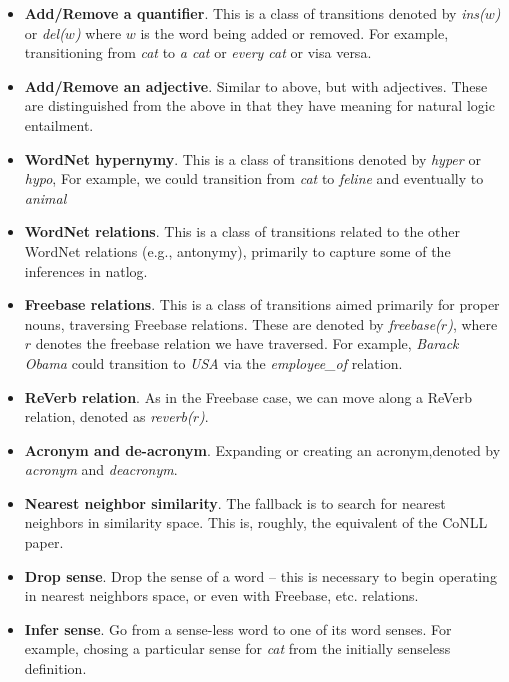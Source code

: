 \documentclass[11pt,a4paper]{article}
\def\w#1{\textit{#1}}
\begin{document}
\begin{itemize}
\item \textbf{Add/Remove a quantifier}.
      This is a class of transitions denoted by
      \textit{ins($w$)} or \textit{del($w$)} 
      where $w$ is the word being added or removed.
      For example, transitioning from \w{cat} to
      \w{a cat} or \w{every cat} or visa versa.
\item \textbf{Add/Remove an adjective}.
      Similar to above, but with adjectives. These are distinguished
      from the above in that they have meaning for natural logic
      entailment.
\item \textbf{WordNet hypernymy}.
      This is a class of transitions denoted by
      \textit{hyper} or \textit{hypo},
      For example, we could transition from \w{cat}
      to \w{feline} and eventually to \w{animal}
\item \textbf{WordNet relations}.
      This is a class of transitions related to the other
      WordNet relations (e.g., antonymy), primarily to
      capture some of the inferences in natlog.
\item \textbf{Freebase relations}.
      This is a class of transitions aimed primarily
      for proper nouns, traversing Freebase relations.
      These are denoted by \textit{freebase($r$)},
      where $r$ denotes the freebase relation we
      have traversed.
      For example, \w{Barack Obama} could transition
      to \w{USA} via the \textit{employee\_of}
      relation.
\item \textbf{ReVerb relation}.
      As in the Freebase case, we can move along a
      ReVerb relation, denoted as \textit{reverb($r$)}.
\item \textbf{Acronym and de-acronym}.
      Expanding or creating an acronym,denoted by
      \textit{acronym} and \textit{deacronym}.
\item \textbf{Nearest neighbor similarity}.
      The fallback is to search for nearest neighbors in similarity space.
      This is, roughly, the equivalent of the CoNLL paper.
\item \textbf{Drop sense}. Drop the sense of a word -- this is necessary to
      begin operating in nearest neighbors space, or even with Freebase, etc.
      relations.
\item \textbf{Infer sense}. Go from a sense-less word to one of its word senses.
      For example, chosing a particular sense for \textit{cat} from the
        initially senseless definition.
\end{itemize}
\end{document}
